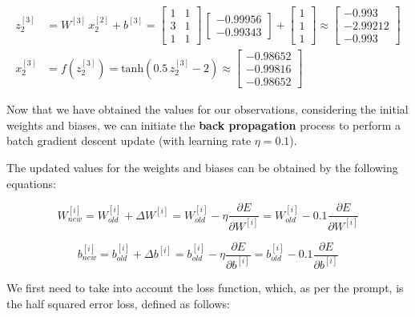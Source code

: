 \documentclass[12pt]{article}
\begin{document}
\begin{enumerate}[leftmargin=\labelsep]
\begin{align*}
                z^{[3]}_2 &= {W}^{[3]} \, {x}^{[2]}_2 + {b}^{[3]} = \begin{bmatrix} 1 & 1 \\ 3 & 1 \\ 1 & 1\end{bmatrix} \,  \begin{bmatrix} -0.99956 \\ -0.99343\end{bmatrix} +
                \begin{bmatrix} 1 \\ 1 \\ 1\end{bmatrix} \approx \begin{bmatrix} -0.993 \\ -2.99212 \\ -0.993\end{bmatrix} \\
                {x}^{[3]}_2 &= f\left({z}^{[3]}_2\right) = \text{tanh}\left(0.5\,{z}^{[3]}_2 - 2\right) \approx \begin{bmatrix} -0.98652 \\ -0.99816 \\ -0.98652\end{bmatrix}
            \end{align*}
            \endgroup

          Now that we have obtained the values for our observations, considering the initial weights and biases, we can initiate the \textbf{back propagation} process
          to perform a batch gradient descent update (with learning rate $\eta = 0.1$).

          The updated values for the weights and biases can be obtained by the following equations:

          \begin{equation}\label{ex2-new-weight}
              W^{[i]}_{new} = W^{[i]}_{old} + \Delta W^{[i]} = W^{[i]}_{old} - \eta \frac{\partial E}{\partial W^{[i]}} = W^{[i]}_{old} - 0.1 \frac{\partial E}{\partial W^{[i]}}
          \end{equation}

          \begin{equation}\label{ex2-new-bias}
              b^{[i]}_{new} = b^{[i]}_{old} + \Delta b^{[i]} = b^{[i]}_{old} - \eta \frac{\partial E}{\partial b^{[i]}} = b^{[i]}_{old} - 0.1 \frac{\partial E}{\partial b^{[i]}}
          \end{equation}

          We first need to take into account the loss function, which, as per the prompt, is the half squared error loss, defined as follows:


\end{enumerate}
\end{document}
